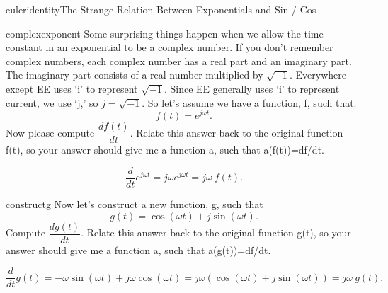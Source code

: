 \begin{mainquestion}{euleridentity}{The Strange Relation Between Exponentials and Sin / Cos}

\questionpoints



\begin{partquestion}{complexexponent}
{Some surprising things happen when we allow the time constant in an exponential to be a complex number.  If you don't remember complex numbers, each complex number has a real part and an imaginary part.  The imaginary part consists of a real number multiplied by $\sqrt{-1}$.  Everywhere except EE uses `i' to represent $\sqrt{-1}$.  Since EE generally uses `i' to represent current, we use `j,' so $j=\sqrt{-1}$.  So let's assume we have a function, f, such that:
\[
f(t) = e^{j\omega t}.
\]
Now please compute $\dfrac{df(t)}{dt}$. Relate this answer back to the original function f(t), so your answer should give me a function a, such that a(f(t))=df/dt.}

\begin{answer}[1.7in]
\[
\frac{d}{dt} e^{j\omega t} = j\omega e^{j\omega t}=j\omega~ f(t).
\]
\end{answer}

\end{partquestion}

\begin{partquestion}{constructg}
{Now let's construct a new function, g, such that
\[
g(t) = \cos(\omega t) + j\sin(\omega t).
\]
Compute $\dfrac{dg(t)}{dt}$. Relate this answer back to the original function g(t), so your answer should give me a function a, such that a(g(t))=df/dt.}

\begin{answer}[1.7in]
\[
\frac{d}{dt}g(t)
= -\omega \sin(\omega t) + j\omega \cos(\omega t)
=j\omega\left(\cos(\omega t) + j\sin(\omega t)\right)=j\omega~ g(t).
\]
\end{answer}


\end{partquestion}
\end{mainquestion}
